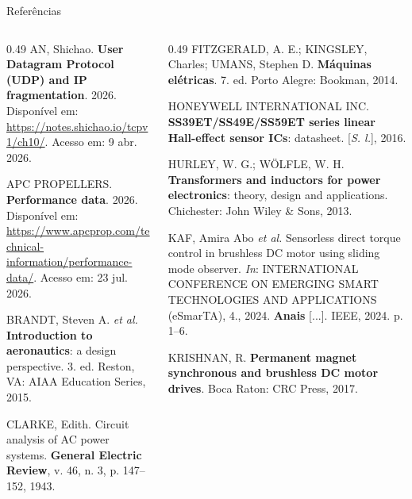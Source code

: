 \begin{frame}{Referências}
  \scriptsize
  \begin{columns}[t]
    \begin{column}{0.49\textwidth}\setlength{\parskip}{0.6em}
      AN, Shichao. \textbf{User Datagram Protocol (UDP) and IP
      fragmentation}. 2026. Disponível em:
      \url{https://notes.shichao.io/tcpv1/ch10/}. Acesso em: 9 abr. 2026.

      APC PROPELLERS. \textbf{Performance data}. 2026. Disponível em:
      \url{https://www.apcprop.com/technical-information/performance-data/}.
      Acesso em: 23 jul. 2026.

      BRANDT, Steven A. \textit{et al.} \textbf{Introduction to
      aeronautics}: a design perspective. 3. ed. Reston, VA: AIAA Education
      Series, 2015.

      CLARKE, Edith. Circuit analysis of AC power systems. \textbf{General
      Electric Review}, v. 46, n. 3, p. 147--152, 1943.    \end{column}
    \begin{column}{0.49\textwidth}\setlength{\parskip}{0.6em}
      FITZGERALD, A. E.; KINGSLEY, Charles; UMANS, Stephen D.
      \textbf{Máquinas elétricas}. 7. ed. Porto Alegre: Bookman, 2014.

      HONEYWELL INTERNATIONAL INC. \textbf{SS39ET/SS49E/SS59ET series linear
      Hall-effect sensor ICs}: datasheet. [\textit{S. l.}], 2016.

      HURLEY, W. G.; WÖLFLE, W. H. \textbf{Transformers and inductors for
      power electronics}: theory, design and applications. Chichester: John
      Wiley \& Sons, 2013.

      KAF, Amira Abo \textit{et al.} Sensorless direct torque control in
      brushless DC motor using sliding mode observer. \textit{In}:
      INTERNATIONAL CONFERENCE ON EMERGING SMART TECHNOLOGIES AND
      APPLICATIONS (eSmarTA), 4., 2024. \textbf{Anais} [...]. IEEE, 2024.
      p. 1--6.

      KRISHNAN, R. \textbf{Permanent magnet synchronous and brushless DC
      motor drives}. Boca Raton: CRC Press, 2017.
    \end{column}
  \end{columns}
\end{frame}

